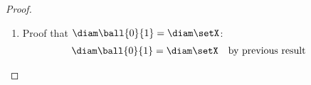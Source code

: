 {\begin{proof}
\begin{enumerate}
  \item Proof that $\diam\ball{0}{1}=\diam\setX$:
    \begin{align*}
      \diam\ball{0}{1}
        &= \diam\setX
        && \text{by previous result}
    \end{align*}

  \end{enumerate}
\end{proof}
}




